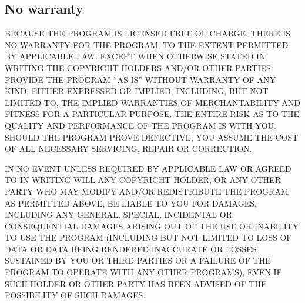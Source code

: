 {\begin{enumerate}
	\end{enumerate}
	
	\subsection*{No warranty}
	
	BECAUSE THE PROGRAM IS LICENSED FREE OF CHARGE, THERE IS NO WARRANTY
	FOR THE PROGRAM, TO THE EXTENT PERMITTED BY APPLICABLE LAW.  EXCEPT
	WHEN OTHERWISE STATED IN WRITING THE COPYRIGHT HOLDERS AND/OR OTHER
	PARTIES PROVIDE THE PROGRAM ``AS IS'' WITHOUT WARRANTY OF ANY KIND,
	EITHER EXPRESSED OR IMPLIED, INCLUDING, BUT NOT LIMITED TO, THE
	IMPLIED WARRANTIES OF MERCHANTABILITY AND FITNESS FOR A PARTICULAR
	PURPOSE.  THE ENTIRE RISK AS TO THE QUALITY AND PERFORMANCE OF THE
	PROGRAM IS WITH YOU.  SHOULD THE PROGRAM PROVE DEFECTIVE, YOU ASSUME
	THE COST OF ALL NECESSARY SERVICING, REPAIR OR CORRECTION.
	
	IN NO EVENT UNLESS REQUIRED BY APPLICABLE LAW OR AGREED TO IN WRITING
	WILL ANY COPYRIGHT HOLDER, OR ANY OTHER PARTY WHO MAY MODIFY AND/OR
	REDISTRIBUTE THE PROGRAM AS PERMITTED ABOVE, BE LIABLE TO YOU FOR
	DAMAGES, INCLUDING ANY GENERAL, SPECIAL, INCIDENTAL OR CONSEQUENTIAL
	DAMAGES ARISING OUT OF THE USE OR INABILITY TO USE THE PROGRAM
	(INCLUDING BUT NOT LIMITED TO LOSS OF DATA OR DATA BEING RENDERED
	INACCURATE OR LOSSES SUSTAINED BY YOU OR THIRD PARTIES OR A FAILURE
	OF THE PROGRAM TO OPERATE WITH ANY OTHER PROGRAMS), EVEN IF SUCH
	HOLDER OR OTHER PARTY HAS BEEN ADVISED OF THE POSSIBILITY OF SUCH
	DAMAGES.
	
}
\endinput
